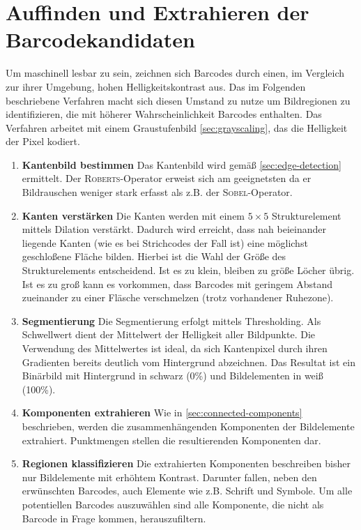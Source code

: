 \chapter{Auffinden und Extrahieren der Barcodekandidaten}
\writtenby{\dcauthornameewie}%
Um maschinell lesbar zu sein, zeichnen sich Barcodes durch einen, im Vergleich zur ihrer Umgebung, hohen Helligkeitskontrast aus.
Das im Folgenden beschriebene Verfahren macht sich diesen Umstand zu nutze um Bildregionen zu identifizieren, die mit höherer Wahrscheinlichkeit Barcodes enthalten.
Das Verfahren arbeitet mit einem Graustufenbild \autoref{sec:grayscaling}, das die Helligkeit der Pixel kodiert.

\begin{enumerate}[(1)]
\item \textbf{Kantenbild bestimmen}
Das Kantenbild wird gemäß \autoref{sec:edge-detection} ermittelt.
Der \textsc{Roberts}-Operator erweist sich am geeignetsten da er Bildrauschen weniger stark erfasst als z.B. der \textsc{Sobel}-Operator.

\item \textbf{Kanten verstärken}
Die Kanten werden mit einem $5\times5$ Strukturelement mittels Dilation verstärkt.
Dadurch wird erreicht, dass nah beieinander liegende Kanten (wie es bei Strichcodes der Fall ist) eine möglichst geschloßene Fläche bilden.
Hierbei ist die Wahl der Größe des Strukturelements entscheidend.
Ist es zu klein, bleiben zu größe Löcher übrig.
Ist es zu groß kann es vorkommen, dass Barcodes mit geringem Abstand zueinander zu einer Fläsche verschmelzen (trotz vorhandener Ruhezone).

\item \textbf{Segmentierung}
Die Segmentierung erfolgt mittels Thresholding.
Als Schwellwert dient der Mittelwert der Helligkeit aller Bildpunkte.
Die Verwendung des Mittelwertes ist ideal, da sich Kantenpixel durch ihren Gradienten bereits deutlich vom Hintergrund abzeichnen.
Das Resultat ist ein Binärbild mit Hintergrund in schwarz (0\%) und Bildelementen in weiß (100\%).

\item \textbf{Komponenten extrahieren}
Wie in \autoref{sec:connected-components} beschrieben, werden die zusammenhängenden Komponenten der Bildelemente extrahiert.
Punktmengen stellen die resultierenden Komponenten dar.

\item \textbf{Regionen klassifizieren}
Die extrahierten Komponenten beschreiben bisher nur Bildelemente mit erhöhtem Kontrast.
Darunter fallen, neben den erwünschten Barcodes, auch Elemente wie z.B. Schrift und Symbole.
Um alle potentiellen Barcodes auszuwählen sind alle Komponente, die nicht als Barcode in Frage kommen, herauszufiltern.


\end{enumerate}

